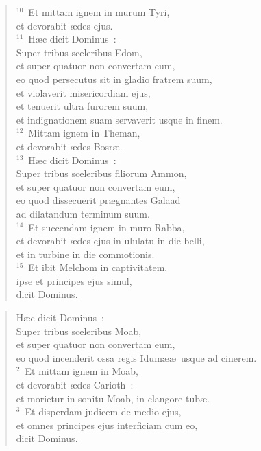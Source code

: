 \begin{flushleft}
\begin{verse}
${}^{10}$~Et mittam ignem in murum Tyri,\\ et devorabit \ae des ejus.\\
${}^{11}$~H\ae c dicit Dominus~:\\ Super tribus sceleribus Edom,\\ et super quatuor non convertam eum,\\ eo quod persecutus sit in gladio fratrem suum,\\ et violaverit misericordiam ejus,\\ et tenuerit ultra furorem suum,\\ et indignationem suam servaverit usque in finem.\\
${}^{12}$~Mittam ignem in Theman,\\ et devorabit \ae des Bosr\ae .\\
${}^{13}$~H\ae c dicit Dominus~:\\ Super tribus sceleribus filiorum Ammon,\\ et super quatuor non convertam eum,\\ eo quod dissecuerit pr\ae gnantes Galaad\\ ad dilatandum terminum suum.\\
${}^{14}$~Et succendam ignem in muro Rabba,\\ et devorabit \ae des ejus in ululatu in die belli,\\ et in turbine in die commotionis.\\
${}^{15}$~Et ibit Melchom in captivitatem,\\ ipse et principes ejus simul,\\ dicit Dominus.\end{verse}\end{flushleft}


\begin{flushleft}\begin{verse}\vspace{-19pt}H\ae c dicit Dominus~:\\ Super tribus sceleribus Moab,\\ et super quatuor non convertam eum,\\ eo quod incenderit ossa regis Idum\ae \ae\ usque ad cinerem.\\
${}^{2}$~Et mittam ignem in Moab,\\ et devorabit \ae des Carioth~:\\ et morietur in sonitu Moab, in clangore tub\ae .\\
${}^{3}$~Et disperdam judicem de medio ejus,\\ et omnes principes ejus interficiam cum eo,\\ dicit Dominus.\end{verse}\end{flushleft}


